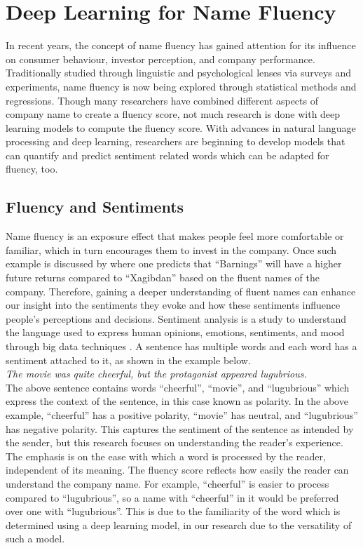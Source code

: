 \documentclass[a4paper,11pt]{report}
\begin{document}
\section{Deep Learning for Name Fluency} \label{deep_model}
In recent years, the concept of name fluency has gained attention for its influence on consumer behaviour, investor perception, and company performance. Traditionally studied through linguistic and psychological lenses via surveys and experiments, name fluency is now being explored through statistical methods and regressions. Though many researchers have combined different aspects of company name to create a fluency score, not much research is done with deep learning models to compute the fluency score. With advances in natural language processing and deep learning, researchers are beginning to develop models that can quantify and predict sentiment related words which can be adapted for fluency, too. 

\subsection{Fluency and Sentiments}

Name fluency is an exposure effect that makes people feel more comfortable or familiar, which in turn encourages them to invest in the company. Once such example is discussed by  where one predicts that ``Barnings'' will have a higher future returns compared to ``Xagibdan'' based on the fluent names of the company. Therefore, gaining a deeper understanding of fluent names can enhance our insight into the sentiments they evoke and how these sentiments influence people’s perceptions and decisions. Sentiment analysis is a study to understand the language used to express human opinions, emotions, sentiments, and mood through big data techniques \cite{sentiment_def}. A sentence has multiple words and each word has a sentiment attached to it, as shown in the example below. \\

\textit{The movie was quite cheerful, but the protagonist appeared lugubrious.}\\

The above sentence contains words ``cheerful'', ``movie'', and ``lugubrious'' which express the context of the sentence, in this case known as polarity. In the above example, ``cheerful'' has a positive polarity, ``movie'' has neutral, and ``lugubrious'' has negative polarity. This captures the sentiment of the sentence as intended by the sender, but this research focuses on understanding the reader's experience. The emphasis is on the ease with which a word is processed by the reader, independent of its meaning. The fluency score reflects how easily the reader can understand the company name. For example, ``cheerful'' is easier to process compared to ``lugubrious'', so a name with ``cheerful'' in it would be  preferred over one with ``lugubrious''. This is due to the familiarity of the word which is determined using a deep learning model, in our research due to the versatility of such a model. 
\end{document}
